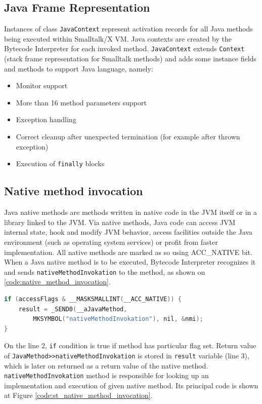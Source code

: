 \documentclass[11pt,twoside,a4paper]{book}
\begin{document}
\subsection{Java Frame Representation}

Instances of class \texttt{JavaContext} represent activation records for all Java methods being executed within Smalltalk/X VM.
Java contexts are  created by the Bytecode Interpreter for each invoked method.
\texttt{JavaContext} extends \texttt{Context} (stack frame representation for Smalltalk methods) and adds some instance fields and methods to support Java language, namely:

\begin{itemize}
	\item Monitor support
	\item More than 16 method parameters support
	\item Exception handling
	\item Correct cleanup after unexpected termination (for example after thrown exception)
	\item Execution of \texttt{finally} blocks
\end{itemize}

\subsection{Native method invocation}

Java native methods are methods written in native code in the JVM itself or in a library linked to the JVM. 
Via native methods, Java code can access JVM internal state, hook and modify JVM behavior, access facilities outside the Java environment (such as operating system services) or profit from faster implementation. All native methods are marked as so using ACC\_NATIVE bit. 
When a Java native method is to be executed, Bytecode Interpreter recognizes it and sends \texttt{nativeMethodInvokation} to the method, as shown on \ref{code:native_method_invocation}.

\begin{lstlisting}[language=C, caption=Checking for and invocation of Java native method, label=code:native_method_invocation]
if (accessFlags & __MASKSMALLINT(__ACC_NATIVE)) {
    result = _SEND0(__aJavaMethod, 
        MKSYMBOL("nativeMethodInvokation"), nil, &nmi);
}
\end{lstlisting}

On the line 2, \texttt{if} condition is true if method has particular flag set.
Return value of \texttt{JavaMethod>>nativeMethodInvokation} is stored in \texttt{result} variable (line 3), which is later on
returned as a return value of the native method. 
\texttt{nativeMethodInvokation} method is responsible for looking up an implementation and execution of given native method. 
Its principal code is shown at Figure \ref{code:st_native_method_invocation}.
\end{document}
